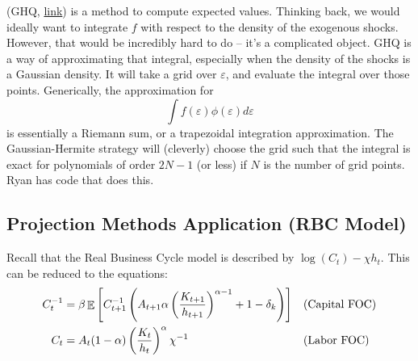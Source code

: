 \documentclass[10pt]{article}
\begin{document}
\begin{definition}
	 (GHQ, \href{https://en.wikipedia.org/wiki/Gauss\%E2\%80\%93Hermite_quadrature}{link}) is a method to compute expected values. Thinking back, we would ideally want to integrate $f$ with respect to the density of the exogenous shocks. However, that would be incredibly hard to do -- it's a complicated object. GHQ is a way of approximating that integral, especially when the density of the shocks is a Gaussian density. It will take a grid over $\varepsilon$, and evaluate the integral over those points. Generically, the approximation for 
	\[
	\int f(\varepsilon) \phi(\varepsilon) d\varepsilon
	\]
	is essentially a Riemann sum, or a trapezoidal integration approximation. The Gaussian-Hermite strategy will (cleverly) choose the grid such that the integral is exact for polynomials of order $2N-1$ (or less) if $N$ is the number of grid points. Ryan has code that does this.
\end{definition}

\subsection{Projection Methods Application (RBC Model)}

Recall that the Real Business Cycle model is described by $\log(C_t) - \chi h_t$. This can be reduced to the equations:
\begin{align*}
	C_t^{-1} &= \beta \mathop{\mathbb{E}}\left[ C_{t+1}^{-1}\left( A_{t+1} \alpha \left( \frac{K_{t+1}}{h_{t+1}}\right)^{\alpha - 1} + 1-\delta_k\right) \right] &&\text{(Capital FOC)} \\
	C_t &= A_t(1-\alpha)\left( \frac{K_t}{h_t}\right)^{\alpha} \chi^{-1} &&\text{(Labor FOC)}
\end{align*}
\end{document}
